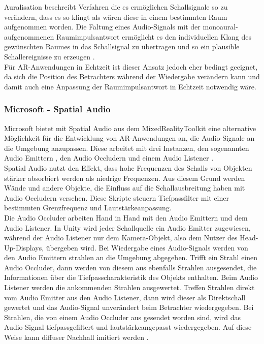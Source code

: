 Auralisation beschreibt Verfahren die es ermöglichen Schallsignale so zu verändern, dass es so klingt als wären diese in einem bestimmten Raum aufgenommen worden. Die Faltung eines Audio-Signals mit der monoaural-aufgenommenen Raumimpulsantwort ermöglicht es den individuellen Klang des gewünschten Raumes  in das Schallsignal zu übertragen und so ein plausible Schallereignisse zu erzeugen  \cite[S.521]{HdA08}.\\

Für AR-Anwendungen in Echtzeit ist dieser Ansatz jedoch eher bedingt geeignet, da sich die Position des Betrachters während der Wiedergabe verändern kann und damit auch eine Anpassung der Raumimpulsantwort in Echtzeit notwendig wäre. \\


\subsubsection{Microsoft - Spatial Audio}
Microsoft bietet mit \glqq  Spatial Audio \grqq{} aus dem MixedRealityToolkit eine alternative Möglichkeit für die Entwicklung von AR-Anwendungen an, die Audio-Signale  an die Umgebung anzupassen. Diese arbeitet mit drei Instanzen, den sogenannten \glqq  Audio Emittern \grqq{} , den  \glqq Audio  Occludern \grqq und einem \glqq Audio Listener \grqq. \\

Spatial Audio nutzt den Effekt, dass hohe Frequenzen des Schalls von Objekten stärker absorbiert werden als niedrige Frequenzen. Aus diesem Grund werden Wände und andere Objekte, die Einfluss auf die Schallausbreitung haben mit Audio Occludern versehen. Diese Skripte steuern Tiefpassfilter mit einer bestimmten Grenzfrequenz und Lautstärkeanpassung. \\

Die Audio Occluder arbeiten Hand in Hand mit den Audio Emittern und dem Audio Listener. In Unity wird jeder Schallquelle ein Audio Emitter zugewiesen, während der Audio Listener nur dem Kamera-Objekt, also dem Nutzer des Head-Up-Displays, übergeben wird. Bei Wiedergabe eines Audio-Signals werden von den Audio Emittern strahlen an die Umgebung abgegeben. Trifft ein Strahl einen Audio Occluder, dann werden von diesem aus ebenfalls Strahlen ausgesendet, die Informationen über die Tiefpasscharakteristik des Objekts enthalten. Beim Audio Listener werden die ankommenden Strahlen ausgewertet. Treffen Strahlen direkt vom Audio Emitter aus den Audio Listener, dann wird dieser als Direktschall gewertet und das Audio-Signal unverändert beim Betrachter wiedergegeben. Bei Strahlen, die von einem Audio Occluder aus gesendet worden sind, wird das Audio-Signal tiefpassgefiltert und lautstärkeangepasst wiedergegeben. Auf diese Weise kann diffuser Nachhall imitiert werden \cite{MSSpatialAudio}.\\

